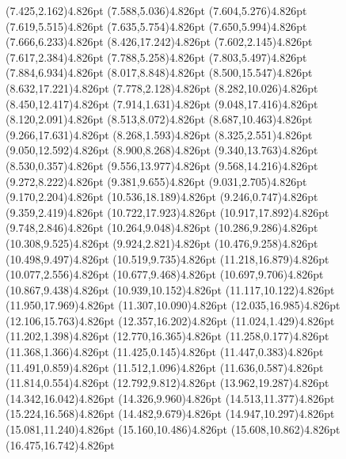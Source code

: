 \documentclass[10pt]{article}
\begin{document}
{{\qdisk(7.425,2.162){4.826pt}%
\qdisk(7.588,5.036){4.826pt}%
\qdisk(7.604,5.276){4.826pt}%
\qdisk(7.619,5.515){4.826pt}%
\qdisk(7.635,5.754){4.826pt}%
\qdisk(7.650,5.994){4.826pt}%
\qdisk(7.666,6.233){4.826pt}%
\qdisk(8.426,17.242){4.826pt}%
\qdisk(7.602,2.145){4.826pt}%
\qdisk(7.617,2.384){4.826pt}%
\qdisk(7.788,5.258){4.826pt}%
\qdisk(7.803,5.497){4.826pt}%
\qdisk(7.884,6.934){4.826pt}%
\qdisk(8.017,8.848){4.826pt}%
\qdisk(8.500,15.547){4.826pt}%
\qdisk(8.632,17.221){4.826pt}%
\qdisk(7.778,2.128){4.826pt}%
\qdisk(8.282,10.026){4.826pt}%
\qdisk(8.450,12.417){4.826pt}%
\qdisk(7.914,1.631){4.826pt}%
\qdisk(9.048,17.416){4.826pt}%
\qdisk(8.120,2.091){4.826pt}%
\qdisk(8.513,8.072){4.826pt}%
\qdisk(8.687,10.463){4.826pt}%
\qdisk(9.266,17.631){4.826pt}%
\qdisk(8.268,1.593){4.826pt}%
\qdisk(8.325,2.551){4.826pt}%
\qdisk(9.050,12.592){4.826pt}%
\qdisk(8.900,8.268){4.826pt}%
\qdisk(9.340,13.763){4.826pt}%
\qdisk(8.530,0.357){4.826pt}%
\qdisk(9.556,13.977){4.826pt}%
\qdisk(9.568,14.216){4.826pt}%
\qdisk(9.272,8.222){4.826pt}%
\qdisk(9.381,9.655){4.826pt}%
\qdisk(9.031,2.705){4.826pt}%
\qdisk(9.170,2.204){4.826pt}%
\qdisk(10.536,18.189){4.826pt}%
\qdisk(9.246,0.747){4.826pt}%
\qdisk(9.359,2.419){4.826pt}%
\qdisk(10.722,17.923){4.826pt}%
\qdisk(10.917,17.892){4.826pt}%
\qdisk(9.748,2.846){4.826pt}%
\qdisk(10.264,9.048){4.826pt}%
\qdisk(10.286,9.286){4.826pt}%
\qdisk(10.308,9.525){4.826pt}%
\qdisk(9.924,2.821){4.826pt}%
\qdisk(10.476,9.258){4.826pt}%
\qdisk(10.498,9.497){4.826pt}%
\qdisk(10.519,9.735){4.826pt}%
\qdisk(11.218,16.879){4.826pt}%
\qdisk(10.077,2.556){4.826pt}%
\qdisk(10.677,9.468){4.826pt}%
\qdisk(10.697,9.706){4.826pt}%
\qdisk(10.867,9.438){4.826pt}%
\qdisk(10.939,10.152){4.826pt}%
\qdisk(11.117,10.122){4.826pt}%
\qdisk(11.950,17.969){4.826pt}%
\qdisk(11.307,10.090){4.826pt}%
\qdisk(12.035,16.985){4.826pt}%
\qdisk(12.106,15.763){4.826pt}%
\qdisk(12.357,16.202){4.826pt}%
\qdisk(11.024,1.429){4.826pt}%
\qdisk(11.202,1.398){4.826pt}%
\qdisk(12.770,16.365){4.826pt}%
\qdisk(11.258,0.177){4.826pt}%
\qdisk(11.368,1.366){4.826pt}%
\qdisk(11.425,0.145){4.826pt}%
\qdisk(11.447,0.383){4.826pt}%
\qdisk(11.491,0.859){4.826pt}%
\qdisk(11.512,1.096){4.826pt}%
\qdisk(11.636,0.587){4.826pt}%
\qdisk(11.814,0.554){4.826pt}%
\qdisk(12.792,9.812){4.826pt}%
\qdisk(13.962,19.287){4.826pt}%
\qdisk(14.342,16.042){4.826pt}%
\qdisk(14.326,9.960){4.826pt}%
\qdisk(14.513,11.377){4.826pt}%
\qdisk(15.224,16.568){4.826pt}%
\qdisk(14.482,9.679){4.826pt}%
\qdisk(14.947,10.297){4.826pt}%
\qdisk(15.081,11.240){4.826pt}%
\qdisk(15.160,10.486){4.826pt}%
\qdisk(15.608,10.862){4.826pt}%
\qdisk(16.475,16.742){4.826pt}%
}}
\end{document}
